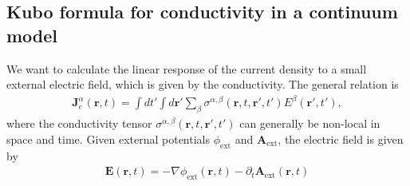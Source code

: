 \documentclass[english]{scrartcl}
\begin{document}
\subsection{Kubo formula for conductivity in a continuum model}
We want to calculate the linear response of the current density to a small external electric field, which is given by the conductivity. The general relation is
\begin{align}
\bm J^\alpha_e(\bm r , t) = \int d t' \int d \bm r' \sum_\beta \sigma^{\alpha, \beta}(\bm r , t, \bm r', t') E^\beta (\bm r', t'), \label{Eqn:Cond_rel}
\end{align}
where the conductivity tensor $\sigma^{\alpha, \beta}(\bm r , t, \bm r', t')$ can generally be non-local in space and time. Given external potentials $\phi_\text{ext}$ and $\bm A_\text{ext}$, the electric field is given by
\begin{align*}
\bm E (\bm r, t) = - \nabla \phi_\text{ext}(\bm r, t) - \partial_t \bm A_\text{ext} (\bm r, t)
\end{align*}
\end{document}
